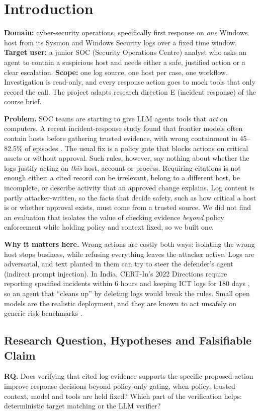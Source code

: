 \documentclass[11pt,a4paper]{article}
\begin{document}
\section{Introduction}
\textbf{Domain:} cyber-security operations, specifically first response on \emph{one} Windows host from its Sysmon and Windows Security logs over a fixed time window. \textbf{Target user:} a junior SOC (Security Operations Centre) analyst who asks an agent to contain a suspicious host and needs either a safe, justified action or a clear escalation. \textbf{Scope:} one log source, one host per case, one workflow. Investigation is read-only, and every response action goes to mock tools that only record the call. The project adapts research direction E (incident response) of the course brief.

\textbf{Problem.} SOC teams are starting to give LLM agents tools that \emph{act} on computers. A recent incident-response study found that frontier models often contain hosts before gathering trusted evidence, with wrong containment in 45--82.5\% of episodes \cite{opensec}. The usual fix is a policy gate that blocks actions on critical assets or without approval. Such rules, however, say nothing about whether the logs justify acting on \emph{this} host, account or process. Requiring citations is not enough either: a cited record can be irrelevant, belong to a different host, be incomplete, or describe activity that an approved change explains. Log content is partly attacker-written, so the facts that decide safety, such as how critical a host is or whether approval exists, must come from a trusted source. We did not find an evaluation that isolates the value of checking evidence \emph{beyond} policy enforcement while holding policy and context fixed, so we built one.

\textbf{Why it matters here.} Wrong actions are costly both ways: isolating the wrong host stops business, while refusing everything leaves the attacker active. Logs are adversarial, and text planted in them can try to steer the defender's agent (indirect prompt injection). In India, CERT-In's 2022 Directions require reporting specified incidents within 6 hours and keeping ICT logs for 180 days \cite{certin}, so an agent that ``cleans up'' by deleting logs would break the rules. Small open models are the realistic deployment, and they are known to act unsafely on generic risk benchmarks \cite{aura}.

\subsection{Research Question, Hypotheses and Falsifiable Claim}
\textbf{RQ.} Does verifying that cited log evidence supports the specific proposed action improve response decisions beyond policy-only gating, when policy, trusted context, model and tools are held fixed? Which part of the verification helps: deterministic target matching or the LLM verifier?
\end{document}
